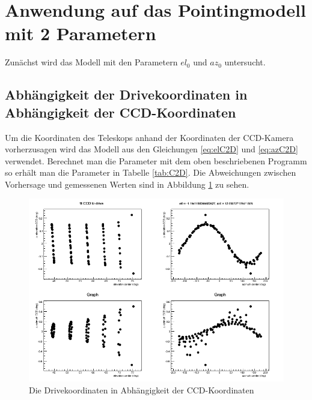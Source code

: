 \section{Anwendung auf das Pointingmodell mit 2 Parametern}
Zunächst wird das Modell mit den Parametern $el_0$ und $az_0$ untersucht.
\subsection{Abhängigkeit der Drivekoordinaten in Abhängigkeit der CCD-Koordinaten}
Um die Koordinaten des Teleskops anhand der Koordinaten der CCD-Kamera vorherzusagen wird das Modell aus den Gleichungen \ref{eq:elC2D} und \ref{eq:azC2D} verwendet. Berechnet man die Parameter mit dem oben beschriebenen Programm so erhält man die Parameter in Tabelle \ref{tab:C2D}. Die Abweichungen zwischen Vorhersage und gemessenen Werten sind in Abbildung \ref{img:C2D} zu sehen.
\begin{figure}[htbp]
\centering
\includegraphics[width=\textwidth]{../341/run341C2D.png}
\caption{Die Drivekoordinaten in Abhängigkeit der CCD-Koordinaten}
\label{img:C2D}
\end{figure}

